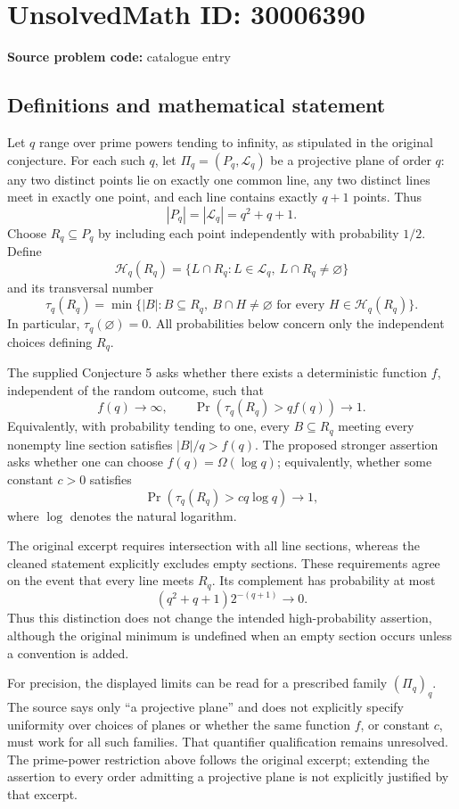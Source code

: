 \documentclass[11pt]{article}
\begin{document}
\section*{UnsolvedMath ID: 30006390}
\textbf{Source problem code:} catalogue entry
\subsection{Definitions and mathematical statement}
Let \(q\) range over prime powers tending to infinity, as stipulated in the original conjecture. For each such \(q\), let \(\Pi_q=(P_q,\mathcal L_q)\) be a projective plane of order \(q\): any two distinct points lie on exactly one common line, any two distinct lines meet in exactly one point, and each line contains exactly \(q+1\) points. Thus
\[
|P_q|=|\mathcal L_q|=q^2+q+1.
\]
Choose \(R_q\subseteq P_q\) by including each point independently with probability \(1/2\). Define
\[
\mathcal H_q(R_q)=\{L\cap R_q:L\in\mathcal L_q,\ L\cap R_q\ne\varnothing\}
\]
and its transversal number
\[
\tau_q(R_q)=\min\bigl\{|B|:B\subseteq R_q,\ B\cap H\ne\varnothing\text{ for every }H\in\mathcal H_q(R_q)\bigr\}.
\]
In particular, \(\tau_q(\varnothing)=0\). All probabilities below concern only the independent choices defining \(R_q\).

The supplied Conjecture 5 asks whether there exists a deterministic function \(f\), independent of the random outcome, such that
\[
f(q)\longrightarrow\infty,
\qquad
\Pr\!\left(\tau_q(R_q)>qf(q)\right)\longrightarrow1.
\]
Equivalently, with probability tending to one, every \(B\subseteq R_q\) meeting every nonempty line section satisfies \(|B|/q>f(q)\). The proposed stronger assertion asks whether one can choose \(f(q)=\Omega(\log q)\); equivalently, whether some constant \(c>0\) satisfies
\[
\Pr\!\left(\tau_q(R_q)>c q\log q\right)\longrightarrow1,
\]
where \(\log\) denotes the natural logarithm.

The original excerpt requires intersection with all line sections, whereas the cleaned statement explicitly excludes empty sections. These requirements agree on the event that every line meets \(R_q\). Its complement has probability at most
\[
(q^2+q+1)2^{-(q+1)}\longrightarrow0.
\]
Thus this distinction does not change the intended high-probability assertion, although the original minimum is undefined when an empty section occurs unless a convention is added.

For precision, the displayed limits can be read for a prescribed family \((\Pi_q)_q\). The source says only ``a projective plane'' and does not explicitly specify uniformity over choices of planes or whether the same function \(f\), or constant \(c\), must work for all such families. That quantifier qualification remains unresolved. The prime-power restriction above follows the original excerpt; extending the assertion to every order admitting a projective plane is not explicitly justified by that excerpt.
\end{document}
